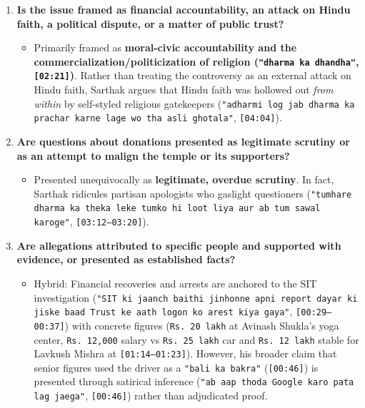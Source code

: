 \documentclass[10pt,a4paper]{article}
\begin{document}
\begin{enumerate}[leftmargin=1.6em, itemsep=4pt, topsep=4pt]
\begin{itemize}[leftmargin=1.4em, itemsep=2pt, topsep=2pt]
    \item \textbf{People Making Allegations:} Local institutional actors like the Ayodhya \texttt{"baar esosieshan"} [Bar Association] threatening a city blockade (\texttt{[01:48]}) are cited alongside \texttt{"apojishan ne alag baval kaat diya hai"} [the opposition has raised its own ruckus] (\texttt{[01:48]}).
  \end{itemize}
  \item \textbf{Is the issue framed as financial accountability, an attack on Hindu faith, a political dispute, or a matter of public trust?}
  \begin{itemize}[leftmargin=1.4em, itemsep=2pt, topsep=2pt]
    \item Primarily framed as \textbf{moral-civic accountability and the commercialization/politicization of religion (\texttt{"dharma ka dhandha"}, \texttt{[02:21]})}. Rather than treating the controversy as an external attack on Hindu faith, Sarthak argues that Hindu faith was hollowed out \textit{from within} by self-styled religious gatekeepers (\texttt{"adharmi log jab dharma ka prachar karne lage wo tha asli ghotala"}, \texttt{[04:04]}).
  \end{itemize}
  \item \textbf{Are questions about donations presented as legitimate scrutiny or as an attempt to malign the temple or its supporters?}
  \begin{itemize}[leftmargin=1.4em, itemsep=2pt, topsep=2pt]
    \item Presented unequivocally as \textbf{legitimate, overdue scrutiny}. In fact, Sarthak ridicules partisan apologists who gaslight questioners (\texttt{"tumhare dharma ka theka leke tumko hi loot liya aur ab tum sawal karoge"}, \texttt{[03:12--03:20]}).
  \end{itemize}
  \item \textbf{Are allegations attributed to specific people and supported with evidence, or presented as established facts?}
  \begin{itemize}[leftmargin=1.4em, itemsep=2pt, topsep=2pt]
    \item Hybrid: Financial recoveries and arrests are anchored to the SIT investigation (\texttt{"SIT ki jaanch baithi jinhonne apni report dayar ki jiske baad Trust ke aath logon ko arest kiya gaya"}, \texttt{[00:29--00:37]}) with concrete figures (\texttt{Rs.\,20 lakh} at Avinash Shukla's yoga center, \texttt{Rs.\,12,000} salary vs \texttt{Rs.\,25 lakh} car and \texttt{Rs.\,12 lakh} stable for Lavkush Mishra at \texttt{[01:14--01:23]}). However, his broader claim that senior figures used the driver as a \texttt{"bali ka bakra"} (\texttt{[00:46]}) is presented through satirical inference (\texttt{"ab aap thoda Google karo pata lag jaega"}, \texttt{[00:46]}) rather than adjudicated proof.

\end{itemize}
\end{enumerate}
\end{document}

